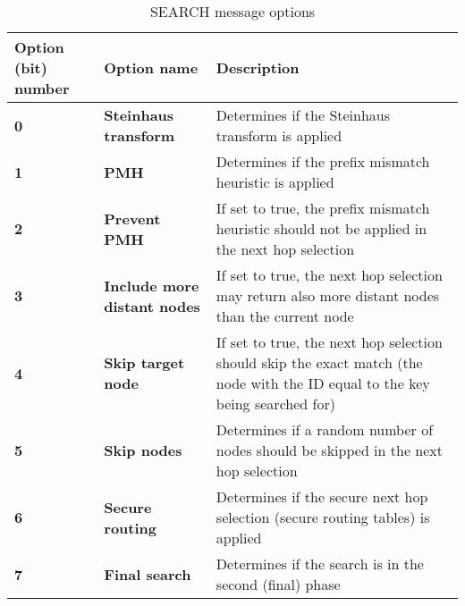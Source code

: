 \begin{table}[H]
\scriptsize
\begin{center}
\begin{tabular}{p{2.7cm} p{3.3cm} p{8.5cm}}
	\hline
	\textbf{Option (bit) number}					& \textbf{Option name}				& \textbf{Description}				\\[1mm]
    \hline
	\textbf{0}								& \textbf{Steinhaus transform}			& Determines if the Steinhaus transform is applied						\\[1.5mm]
    \textbf{1}								& \textbf{PMH}							& Determines if the prefix mismatch heuristic is applied				\\[1.5mm]
	\textbf{2}								& \textbf{Prevent PMH}					& If set to true, the prefix mismatch heuristic should not be applied in the next hop selection			\\[1.5mm]
	\textbf{3}								& \textbf{Include more distant nodes}	& If set to true, the next hop selection may return also more distant nodes than the current node		\\[1.5mm]
	\textbf{4}								& \textbf{Skip target node}				& If set to true, the next hop selection should skip the exact match (the node with the ID equal to the key being searched for)			\\[1.5mm]
	\textbf{5}								& \textbf{Skip nodes}					& Determines if a random number of nodes should be skipped in the next hop selection					\\[1.5mm]
	\textbf{6}								& \textbf{Secure routing}				& Determines if the secure next hop selection (secure routing tables) is applied							\\[1.5mm]
	\textbf{7}								& \textbf{Final search}					& Determines if the search is in the second (final) phase				\\[1.5mm]	
    \hline
\end{tabular}
\end{center}
\caption{SEARCH message options}
\label{tab:mSearchOptions}
\end{table}






